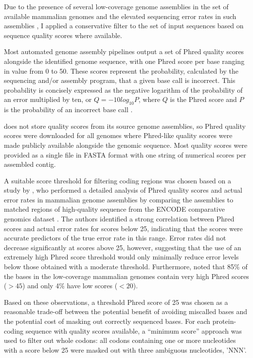 Due to the presence of several low-coverage genome assemblies in the
set of available mammalian genomes and the elevated sequencing error
rates in such assemblies \citep{Hubbard2007}, I applied a conservative
filter to the set of input sequences based on sequence quality scores
where available.

Most automated genome assembly pipelines output a set of Phred quality
scores alongside the identified genome sequence, with one Phred score
per base ranging in value from 0 to 50. These scores represent the
probability, calculated by the sequencing and/or assembly program,
that a given base call is incorrect. This probability is concisely
expressed as the negative logarithm of the probability of an error
multiplied by ten, or $Q=-10log_{10}P$, where $Q$ is the Phred score
and $P$ is the probability of an incorrect base call \citep{Cock2010}.

\ens does not store quality scores from its source genome assemblies,
so Phred quality scores were downloaded for all \lcv genomes where
Phred-like quality scores were made publicly available alongside the
genomic sequence. Most quality scores were provided as a single file
in FASTA format with one string of numerical scores per assembled
contig.

A suitable score threshold for filtering coding regions was chosen
based on a study by \citet{Hubisz2011}, who performed a detailed
analysis of Phred quality scores and actual error rates in \lcv
mammalian genome assemblies by comparing the \lcv assemblies to
matched regions of high-quality sequence from the ENCODE comparative
genomics dataset \citep{Birney2007}. The authors identified a strong
correlation between Phred scores and actual error rates for scores
below 25, indicating that the scores were accurate predictors of the
true error rate in this range. Error rates did not decrease
significantly at scores above 25, however, suggesting that the use of
an extremely high Phred score threshold would only minimally reduce
error levels below those obtained with a moderate
threshold. Furthermore, \citet{Hubisz2011} noted that 85\% of the
bases in the low-coverage mammalian genomes contain very high Phred
scores ($>45$) and only 4\% have low scores ($<20$).

Based on these observations, a threshold Phred score of 25 was chosen
as a reasonable trade-off between the potential benefit of avoiding
miscalled bases and the potential cost of masking out correctly
sequenced bases. For each protein-coding sequence with quality scores
available, a ``minimum score'' approach was used to filter out whole
codons: all codons containing one or more nucleotides with a score
below 25 were masked out with three ambiguous nucleotides, 'NNN'.

